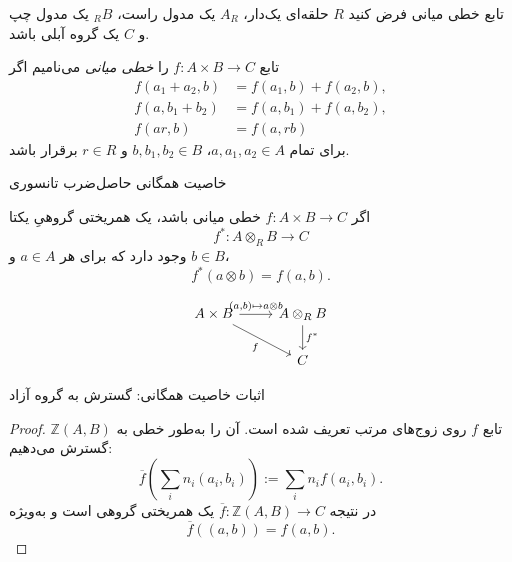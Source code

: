 \begin{frame}[t]{تابع خطی میانی}
    \label{lec19:balanced-map}
    فرض کنید $R$ حلقه‌ای یک‌دار، $A_R$ یک مدول راست، ${}_RB$ یک مدول چپ
    و $C$ یک گروه آبلی باشد.
    \begin{definition}
    تابع $f:A\times B\longrightarrow C$ را \textit{خطی میانی} می‌نامیم اگر
    \[
    \begin{aligned}
        f(a_1+a_2,b)&=f(a_1,b)+f(a_2,b),\\
        f(a,b_1+b_2)&=f(a,b_1)+f(a,b_2),\\
        f(ar,b)&=f(a,rb)
    \end{aligned}
    \]
    برای تمام $a,a_1,a_2\in A$، $b,b_1,b_2\in B$ و $r\in R$ برقرار باشد.
    \end{definition}
\end{frame}

\begin{frame}[t]{خاصیت همگانی حاصل‌ضرب تانسوری}
    \label{lec19:universal-property}
    \begin{theorem}
    اگر $f:A\times B\longrightarrow C$ خطی میانی باشد، یک همریختی گروهیِ
    یکتا
    \[
        f^*:A\otimes_R B\longrightarrow C
    \]
    وجود دارد که برای هر $a\in A$ و $b\in B$،
    \[
        f^*(a\otimes b)=f(a,b).
    \]
    \end{theorem}
    \[
    \begin{tikzcd}[ampersand replacement=\&]
        A\times B \arrow[r,"{(a,b)\mapsto a\otimes b}"] \arrow[dr,"f"']
            \& A\otimes_R B \arrow[d,"f^*"]\\
            \& C
    \end{tikzcd}
    \]
\end{frame}

\begin{frame}[t]{اثبات خاصیت همگانی: گسترش به گروه آزاد}
    \label{lec19:universal-extension}
    \begin{proof}
    تابع $f$ روی زوج‌های مرتب تعریف شده است. آن را به‌طور خطی به
    $\mathbb Z(A,B)$ گسترش می‌دهیم:
    \[
        \overline f\left(\sum_i n_i(a_i,b_i)\right)
        :=\sum_i n_i f(a_i,b_i).
    \]
    در نتیجه $\overline f:\mathbb Z(A,B)\longrightarrow C$ یک همریختی
    گروهی است و به‌ویژه
    \[
        \overline f((a,b))=f(a,b).
    \]
    \end{proof}
\end{frame}

